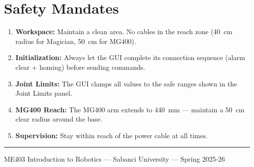 \documentclass[11pt,a4paper]{article}
\begin{document}
\section{Safety Mandates}

\begin{tcolorbox}[safetybox, title={Mandatory Safety Rules}]
\begin{enumerate}
  \item \textbf{Workspace:} Maintain a clean area. No cables in the reach zone (\qty{40}{\cm} radius for Magician, \qty{50}{\cm} for MG400).
  \item \textbf{Initialization:} Always let the GUI complete its connection sequence (alarm clear + homing) before sending commands.
  \item \textbf{Joint Limits:} The GUI clamps all values to the safe ranges shown in the Joint Limits panel.
  \item \textbf{MG400 Reach:} The MG400 arm extends to \qty{440}{\mm} — maintain a \qty{50}{\cm} clear radius around the base.
  \item \textbf{Supervision:} Stay within reach of the power cable at all times.
\end{enumerate}
\end{tcolorbox}

\vfill
\rule{\linewidth}{0.4pt}
\begin{center}
  \small ME403 Introduction to Robotics --- Sabanci University --- Spring 2025-26
\end{center}
\end{document}
